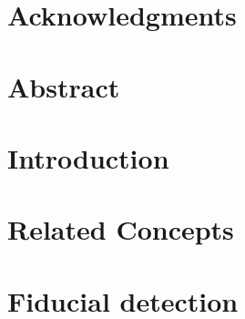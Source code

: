 \documentclass[11pt]{book}
\renewcommand{\baselinestretch}{1.3}
\begin{document}



\newpage
\thispagestyle{empty}
\renewcommand{\thesisdedication}{{\large Copyright \copyright~~Mallikarjun B R, 2016\\}{\large All Rights Reserved\\}}
\thesisdedicationpage



\newpage
\thispagestyle{empty}
\renewcommand{\thesisdedication}{\large To My Family}
\thesisdedicationpage

\mastersthesis
\renewcommand{\baselinestretch}{1.5}

\chapter*{Acknowledgments}
\label{ch:ack}


\chapter*{Abstract}
\label{ch:abstract}


\tableofcontents
\listoffigures
\listoftables

\chapter{Introduction}
\label{ch:introduction}



\chapter{Related Concepts}
\label{ch:concepts}



\chapter{Fiducial detection} 
\label{ch:fid}


\end{document}
